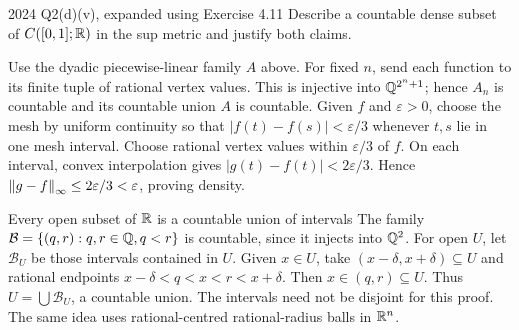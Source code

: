 \begin{exam}{2024 Q2(d)(v), expanded using Exercise 4.11}
Describe a countable dense subset of $C([0,1];\mathbb R)$ in the sup metric and justify both claims.
\end{exam}
\begin{answer}
Use the dyadic piecewise-linear family $A$ above. For fixed $n$, send each function to its finite tuple of rational vertex values. This is injective into $\mathbb Q^{2^n+1}$; hence $A_n$ is countable and its countable union $A$ is countable. Given $f$ and $\varepsilon>0$, choose the mesh by uniform continuity so that $|f(t)-f(s)|<\varepsilon/3$ whenever $t,s$ lie in one mesh interval. Choose rational vertex values within $\varepsilon/3$ of $f$. On each interval, convex interpolation gives $|g(t)-f(t)|<2\varepsilon/3$. Hence $\left\lVert g-f\right\rVert_\infty\le2\varepsilon/3<\varepsilon$, proving density.
\end{answer}
\begin{note}{Every open subset of $\mathbb R$ is a countable union of intervals}
The family $\mathcal B=\{(q,r):q,r\in\mathbb Q,q<r\}$ is countable, since it injects into $\mathbb Q^2$. For open $U$, let $\mathcal B_U$ be those intervals contained in $U$. Given $x\in U$, take $(x-\delta,x+\delta)\subseteq U$ and rational endpoints $x-\delta<q<x<r<x+\delta$. Then $x\in(q,r)\subseteq U$. Thus $U=\bigcup\mathcal B_U$, a countable union. The intervals need not be disjoint for this proof. The same idea uses rational-centred rational-radius balls in $\mathbb R^n$.
\end{note}


